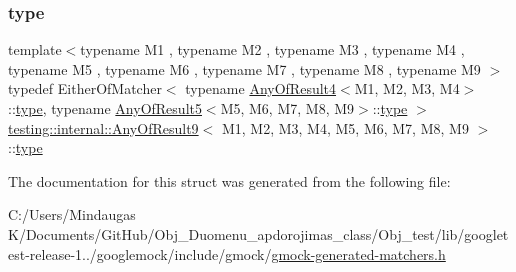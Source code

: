 \subsubsection{\texorpdfstring{type}{type}}
{\footnotesize\ttfamily template$<$typename M1 , typename M2 , typename M3 , typename M4 , typename M5 , typename M6 , typename M7 , typename M8 , typename M9 $>$ \\
typedef Either\+Of\+Matcher$<$ typename \mbox{\hyperlink{structtesting_1_1internal_1_1_any_of_result4}{Any\+Of\+Result4}}$<$M1, M2, M3, M4$>$\+::\mbox{\hyperlink{structtesting_1_1internal_1_1_any_of_result9_a308935fb02c62f502044dcc7b0a2b464}{type}}, typename \mbox{\hyperlink{structtesting_1_1internal_1_1_any_of_result5}{Any\+Of\+Result5}}$<$M5, M6, M7, M8, M9$>$\+::\mbox{\hyperlink{structtesting_1_1internal_1_1_any_of_result9_a308935fb02c62f502044dcc7b0a2b464}{type}} $>$ \mbox{\hyperlink{structtesting_1_1internal_1_1_any_of_result9}{testing\+::internal\+::\+Any\+Of\+Result9}}$<$ M1, M2, M3, M4, M5, M6, M7, M8, M9 $>$\+::\mbox{\hyperlink{structtesting_1_1internal_1_1_any_of_result9_a308935fb02c62f502044dcc7b0a2b464}{type}}}



The documentation for this struct was generated from the following file\+:\begin{DoxyCompactItemize}
\item 
C\+:/\+Users/\+Mindaugas K/\+Documents/\+Git\+Hub/\+Obj\+\_\+\+Duomenu\+\_\+apdorojimas\+\_\+class/\+Obj\+\_\+test/lib/googletest-\/release-\/1../googlemock/include/gmock/\mbox{\hyperlink{_obj__test_2lib_2googletest-release-1_88_81_2googlemock_2include_2gmock_2gmock-generated-matchers_8h}{gmock-\/generated-\/matchers.\+h}}\end{DoxyCompactItemize}
